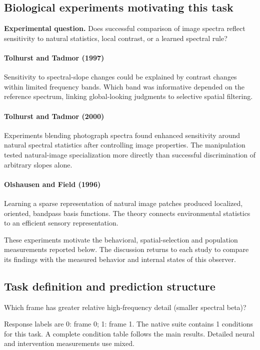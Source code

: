 \documentclass[11pt]{article}
\begin{document}
\subsection{Biological experiments motivating this task}
\textbf{Experimental question.} Does successful comparison of image spectra reflect sensitivity to natural statistics, local contrast, or a learned spectral rule?

\paragraph{Tolhurst and Tadmor (1997)} Sensitivity to spectral-slope changes could be explained by contrast changes within limited frequency bands. Which band was informative depended on the reference spectrum, linking global-looking judgments to selective spatial filtering. \cite{bio_tolhurst97}

\paragraph{Tolhurst and Tadmor (2000)} Experiments blending photograph spectra found enhanced sensitivity around natural spectral statistics after controlling image properties. The manipulation tested natural-image specialization more directly than successful discrimination of arbitrary slopes alone. \cite{bio_tolhurst00}

\paragraph{Olshausen and Field (1996)} Learning a sparse representation of natural image patches produced localized, oriented, bandpass basis functions. The theory connects environmental statistics to an efficient sensory representation. \cite{bio_olshausen}

These experiments motivate the behavioral, spatial-selection and population measurements reported below. The discussion returns to each study to compare its findings with the measured behavior and internal states of this observer.
\subsection{Task definition and prediction structure}
Which frame has greater relative high-frequency detail (smaller spectral beta)?

Response labels are 0: frame 0; 1: frame 1. The native suite contains 1 conditions for this task. A complete condition table follows the main results. Detailed neural and intervention measurements use mixed.
\end{document}
